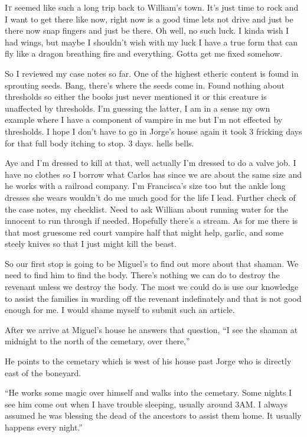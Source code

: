 \lettrine[lines=2,lraise=0]{I}t seemed like such a long trip back to William's town. It's just time to rock and I want to get there like now, right now is a good time lets not drive and just be there now snap fingers and just be there. Oh well, no such luck. I kinda wish I had wings, but maybe I shouldn't wish with my luck I have a true form that can fly like a dragon breathing fire and everything. Gotta get me fixed somehow.

So I reviewed my case notes so far. One of the highest etheric content is found in sprouting seeds. Bang, there's where the seeds come in. Found nothing about thresholds so either the books just never mentioned it or this creature is unaffected by thresholds. I'm guessing the latter, I am in a sense my own example where I have a component of vampire in me but I'm not effected by thresholds. I hope I don't have to go in Jorge's house again it took 3 fricking days for that full body itching to stop. 3 days. hells bells. 

Aye and I'm dressed to kill at that, well actually I'm dressed to do a valve job. I have no clothes so I borrow what Carlos has since we are about the same size and he works with a railroad company. I'm Francisca's size too but the ankle long dresses she wears wouldn't do me much good for the life I lead. Further check of the case notes, my checklist. Need to ask William about running water for the innocent to run through if needed. Hopefully there's a stream. As for me there is that most gruesome red court vampire half that might help, garlic, and some steely knives so that I just might kill the beast. 

So our first stop is going to be Miguel's to find out more about that shaman. We need to find him to find the body. There's nothing we can do to destroy the revenant unless we destroy the body. The most we could do is use our knowledge to assist the families in warding off the revenant indefinately and that is not good enough for me. I would shame myself to submit such an article.

After we arrive at Miguel's house he answers that question, ``I see the shaman at midnight to the north of the cemetary, over there,'' 

He points to the cemetary which is west of his house past Jorge who is directly east of the boneyard. 

``He works some magic over himself and walks into the cemetary. Some nights I see him come out when I have trouble sleeping, usually around 3AM. I always assumed he was blessing the dead of the ancestors to assist them home. It usually happens every night.'' 

